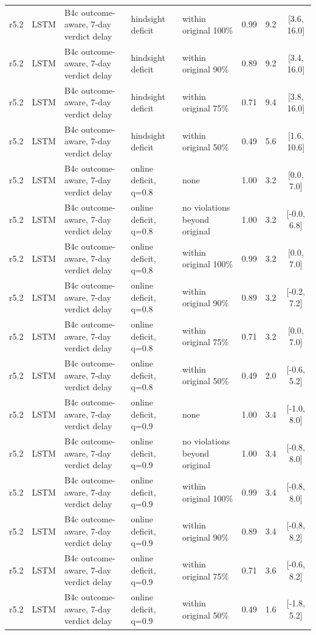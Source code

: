 \begin{longtable}{lllp{4.2cm}p{3.4cm}ccc}
r5.2 & LSTM & B4c outcome-aware, 7-day verdict delay & hindsight deficit & within original 100\% & 0.99 & 9.2 & [3.6, 16.0] \\
r5.2 & LSTM & B4c outcome-aware, 7-day verdict delay & hindsight deficit & within original 90\% & 0.89 & 9.2 & [3.4, 16.0] \\
r5.2 & LSTM & B4c outcome-aware, 7-day verdict delay & hindsight deficit & within original 75\% & 0.71 & 9.4 & [3.8, 16.0] \\
r5.2 & LSTM & B4c outcome-aware, 7-day verdict delay & hindsight deficit & within original 50\% & 0.49 & 5.6 & [1.6, 10.6] \\
r5.2 & LSTM & B4c outcome-aware, 7-day verdict delay & online deficit, q=0.8 & none & 1.00 & 3.2 & [0.0, 7.0] \\
r5.2 & LSTM & B4c outcome-aware, 7-day verdict delay & online deficit, q=0.8 & no violations beyond original & 1.00 & 3.2 & [-0.0, 6.8] \\
r5.2 & LSTM & B4c outcome-aware, 7-day verdict delay & online deficit, q=0.8 & within original 100\% & 0.99 & 3.2 & [0.0, 7.0] \\
r5.2 & LSTM & B4c outcome-aware, 7-day verdict delay & online deficit, q=0.8 & within original 90\% & 0.89 & 3.2 & [-0.2, 7.2] \\
r5.2 & LSTM & B4c outcome-aware, 7-day verdict delay & online deficit, q=0.8 & within original 75\% & 0.71 & 3.2 & [0.0, 7.0] \\
r5.2 & LSTM & B4c outcome-aware, 7-day verdict delay & online deficit, q=0.8 & within original 50\% & 0.49 & 2.0 & [-0.6, 5.2] \\
r5.2 & LSTM & B4c outcome-aware, 7-day verdict delay & online deficit, q=0.9 & none & 1.00 & 3.4 & [-1.0, 8.0] \\
r5.2 & LSTM & B4c outcome-aware, 7-day verdict delay & online deficit, q=0.9 & no violations beyond original & 1.00 & 3.4 & [-0.8, 8.0] \\
r5.2 & LSTM & B4c outcome-aware, 7-day verdict delay & online deficit, q=0.9 & within original 100\% & 0.99 & 3.4 & [-0.8, 8.0] \\
r5.2 & LSTM & B4c outcome-aware, 7-day verdict delay & online deficit, q=0.9 & within original 90\% & 0.89 & 3.4 & [-0.8, 8.2] \\
r5.2 & LSTM & B4c outcome-aware, 7-day verdict delay & online deficit, q=0.9 & within original 75\% & 0.71 & 3.6 & [-0.6, 8.2] \\
r5.2 & LSTM & B4c outcome-aware, 7-day verdict delay & online deficit, q=0.9 & within original 50\% & 0.49 & 1.6 & [-1.8, 5.2] \\

\end{longtable}
